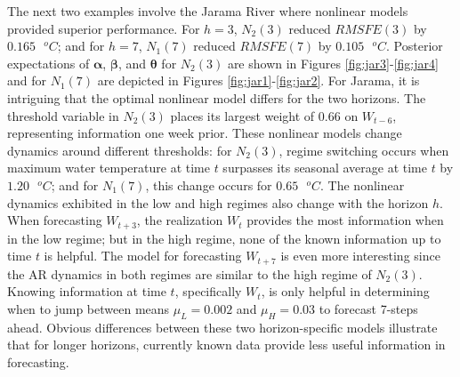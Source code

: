 The next two examples involve the Jarama River where nonlinear models provided superior performance. For $h=3$, $N_2(3)$ reduced $RMSFE(3)$ by  $0.165 \textrm{ }^o C$; and for $h=7$, $N_1(7)$ reduced $RMSFE(7)$ by $0.105 \textrm{ }^o C$. Posterior expectations of $\bm{\alpha}$, $\bm{\beta}$, and $\bm{\theta}$ for $N_2(3)$ are shown in Figures \ref{fig:jar3}-\ref{fig:jar4} and for $N_1(7)$ are depicted in Figures \ref{fig:jar1}-\ref{fig:jar2}. For Jarama, it is intriguing that the optimal nonlinear model differs for the two horizons. The threshold variable in $N_2(3)$ places its largest weight of $0.66$ on $W_{t-6}$, representing information one week prior. These nonlinear models change dynamics around different thresholds: for $N_2(3)$, regime switching occurs when maximum water temperature at time $t$ surpasses its seasonal average at time $t$ by $1.20 \textrm{ }^o C$; and for $N_1(7)$, this change occurs for $0.65 \textrm{ }^o C$. The nonlinear dynamics exhibited in the low and high regimes also change with the horizon $h$. When forecasting $W_{t+3}$, the realization $W_t$ provides the most information when in the low regime; but in the high regime, none of the known information up to time $t$ is helpful. The model for forecasting $W_{t+7}$ is even more interesting since the AR dynamics in both regimes are similar to the high regime of $N_2(3)$. Knowing information at time $t$, specifically $W_t$, is only helpful in determining when to jump between means $\mu_L=0.002$ and $\mu_H=0.03$ to forecast 7-steps ahead. Obvious differences between these two horizon-specific models illustrate that for longer horizons, currently known data provide less useful information in forecasting.

